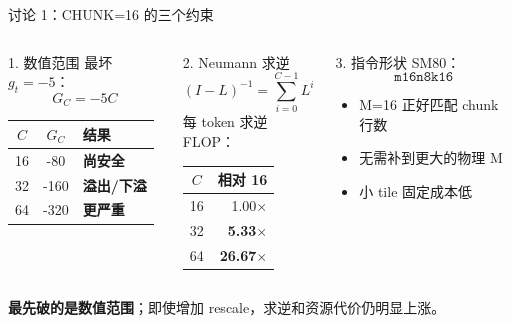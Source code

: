 \documentclass[aspectratio=169,10pt]{beamer}
\newcommand{\good}[1]{\textcolor{KdaGreen}{\textbf{#1}}}
\newcommand{\bad}[1]{\textcolor{KdaRed}{\textbf{#1}}}
\newcommand{\code}[1]{\texttt{#1}}
\begin{document}
\begin{frame}{讨论 1：CHUNK=16 的三个约束}
  \begin{columns}[T,onlytextwidth]
      \begin{block}{1. 数值范围}
        最坏 $g_t=-5$：
        \[
          G_C=-5C
        \]
        \begin{tabular}{ccl}
          $C$ & $G_C$ & 结果 \\
          \hline
          16 & -80 & \good{尚安全} \\
          32 & -160 & \bad{溢出/下溢} \\
          64 & -320 & \bad{更严重}
        \end{tabular}
      \end{block}

      \begin{block}{2. Neumann 求逆}
        \[
          (I-L)^{-1}=\sum_{i=0}^{C-1}L^i
        \]
        每 token 求逆 FLOP：
        \begin{tabular}{cr}
          $C$ & 相对 16 \\
          \hline
          16 & 1.00$\times$ \\
          32 & \bad{5.33$\times$} \\
          64 & \bad{26.67$\times$}
        \end{tabular}
      \end{block}

      \begin{block}{3. 指令形状}
        SM80：
        \[
          \code{m16n8k16}
        \]
        \begin{itemize}
          \item M=16 正好匹配 chunk 行数
          \item 无需补到更大的物理 M
          \item 小 tile 固定成本低
        \end{itemize}
      \end{block}
  \end{columns}

  \vspace{0.4em}
  \centering\large
  \bad{最先破的是数值范围}；即使增加 rescale，求逆和资源代价仍明显上涨。

\end{frame}
\end{document}
